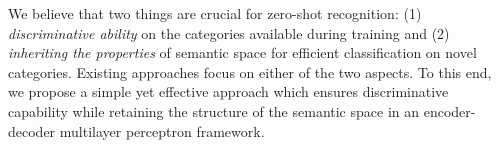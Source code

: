 \documentclass[10pt,twocolumn,letterpaper]{article}
\begin{document}
We believe that two things are crucial for zero-shot recognition: (1) \textit{discriminative ability} on the categories available during training and (2) \textit{inheriting the properties} of semantic space for efficient classification on novel categories.  
Existing approaches focus on either of the two aspects.
To this end, we propose a simple yet effective approach which ensures discriminative capability while retaining the structure of the semantic space in an encoder-decoder multilayer perceptron framework. %
\end{document}
